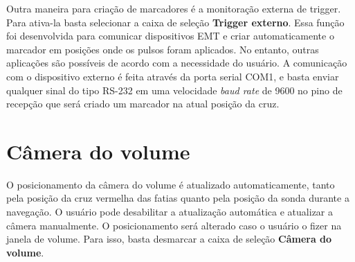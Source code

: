 Outra maneira para criação de marcadores é a monitoração externa de trigger. Para ativa-la basta selecionar a caixa de seleção \textbf{Trigger externo}. Essa função foi desenvolvida para comunicar dispositivos EMT e criar automaticamente o marcador em posições onde os pulsos foram aplicados. No entanto, outras aplicações são possíveis de acordo com a necessidade do usuário.
A comunicação com o dispositivo externo é feita através da porta serial COM1, e basta enviar qualquer sinal do tipo RS-232 em uma velocidade \textit{baud rate} de 9600 no pino de recepção que será criado um marcador na atual posição da cruz.

\section{Câmera do volume}

O posicionamento da câmera do volume é atualizado automaticamente, tanto pela posição da cruz vermelha das fatias quanto pela posição da sonda durante a navegação. O usuário pode desabilitar a atualização automática e atualizar a câmera manualmente. O posicionamento será alterado caso o usuário o fizer na janela de volume.  Para isso, basta desmarcar a caixa de seleção \textbf{Câmera do volume}.
